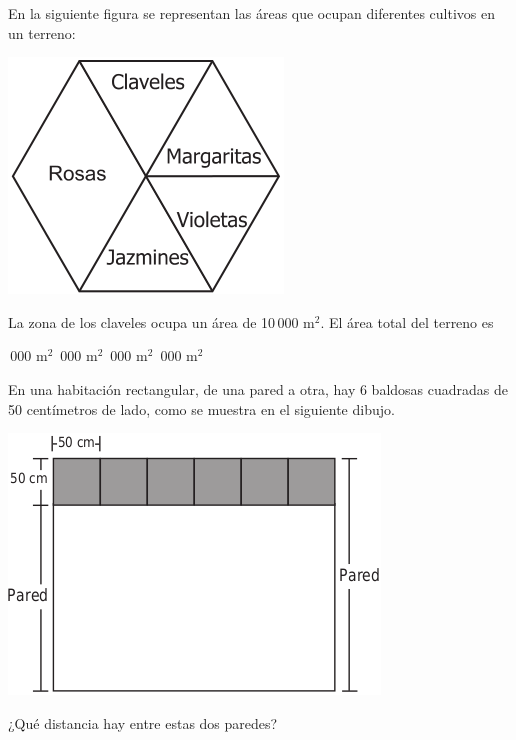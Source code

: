 \documentclass[10pt,letterpaper,addpoints]{exam}
\begin{document}
\begin{multicols}{2}
\begin{questions}
\begin{oneparchoices}
\end{oneparchoices}
\question En la siguiente figura se representan las áreas que ocupan diferentes cultivos en un terreno:
\begin{center}
\includegraphics[scale=.4]{Images/claveles.png} 
\end{center}
La zona de los claveles ocupa un área de 10\,000 m$^{2}$. El área total del terreno es
\begin{multicols}{2}
\begin{choices}
\,000 m$^{2}$
\,000 m$^{2}$
\,000 m$^{2}$
\,000 m$^{2}$
\end{choices}
\end{multicols}
\question En una habitación rectangular, de una pared a otra, hay 6 baldosas cuadradas de 50 centímetros de lado, como se muestra en el siguiente dibujo.
\begin{center}
\includegraphics[scale=.5]{Images/habitacion.png} 
\end{center}
¿Qué distancia hay entre estas dos paredes?
\begin{multicols}{2}
\begin{choices}

\end{choices}
\end{multicols}
\end{questions}
\end{multicols}
\end{document}

